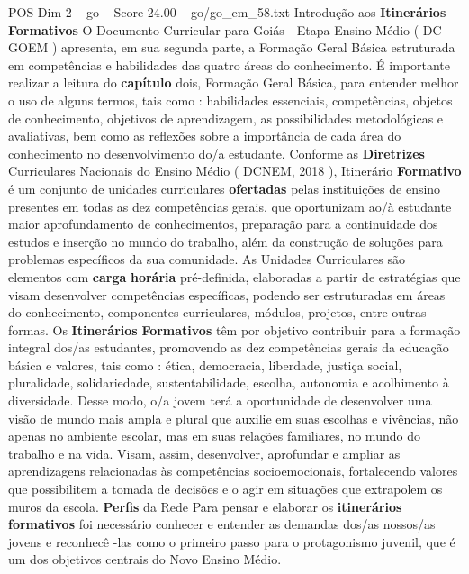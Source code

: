 \begin{textsample}{POS Dim 2 – go – Score 24.00 – go/go\_em\_58.txt}  \label{ex:f2_pos_177}
Introdução aos \textbf{Itinerários} \textbf{Formativos} O Documento Curricular para Goiás - Etapa Ensino Médio ( DC-GOEM ) apresenta, em sua segunda parte, a Formação Geral Básica estruturada em competências e habilidades das quatro áreas do conhecimento.
É importante realizar a leitura do \textbf{capítulo} dois, Formação Geral Básica, para entender melhor o uso de alguns termos, tais como : habilidades essenciais, competências, objetos de conhecimento, objetivos de aprendizagem, as possibilidades metodológicas e avaliativas, bem como as reflexões sobre a importância de cada área do conhecimento no desenvolvimento do/a estudante.
Conforme as \textbf{Diretrizes} Curriculares Nacionais do Ensino Médio ( DCNEM, 2018 ), Itinerário \textbf{Formativo} é um conjunto de unidades curriculares \textbf{ofertadas} pelas instituições de ensino presentes em todas as dez competências gerais, que oportunizam ao/à estudante maior aprofundamento de conhecimentos, preparação para a continuidade dos estudos e inserção no mundo do trabalho, além da construção de soluções para problemas específicos da sua comunidade.
As Unidades Curriculares são elementos com \textbf{carga} \textbf{horária} pré-definida, elaboradas a partir de estratégias que visam desenvolver competências específicas, podendo ser estruturadas em áreas do conhecimento, componentes curriculares, módulos, projetos, entre outras formas.
Os \textbf{Itinerários} \textbf{Formativos} têm por objetivo contribuir para a formação integral dos/as estudantes, promovendo as dez competências gerais da educação básica e valores, tais como : ética, democracia, liberdade, justiça social, pluralidade, solidariedade, sustentabilidade, escolha, autonomia e acolhimento à diversidade.
Desse modo, o/a jovem terá a oportunidade de desenvolver uma visão de mundo mais ampla e plural que auxilie em suas escolhas e vivências, não apenas no ambiente escolar, mas em suas relações familiares, no mundo do trabalho e na vida.
Visam, assim, desenvolver, aprofundar e ampliar as aprendizagens relacionadas às competências socioemocionais, fortalecendo valores que possibilitem a tomada de decisões e o agir em situações que extrapolem os muros da escola. \textbf{Perfis} da Rede Para pensar e elaborar os \textbf{itinerários} \textbf{formativos} foi necessário conhecer e entender as demandas dos/as nossos/as jovens e reconhecê -las como o primeiro passo para o protagonismo juvenil, que é um dos objetivos centrais do Novo Ensino Médio.

\end{textsample}
